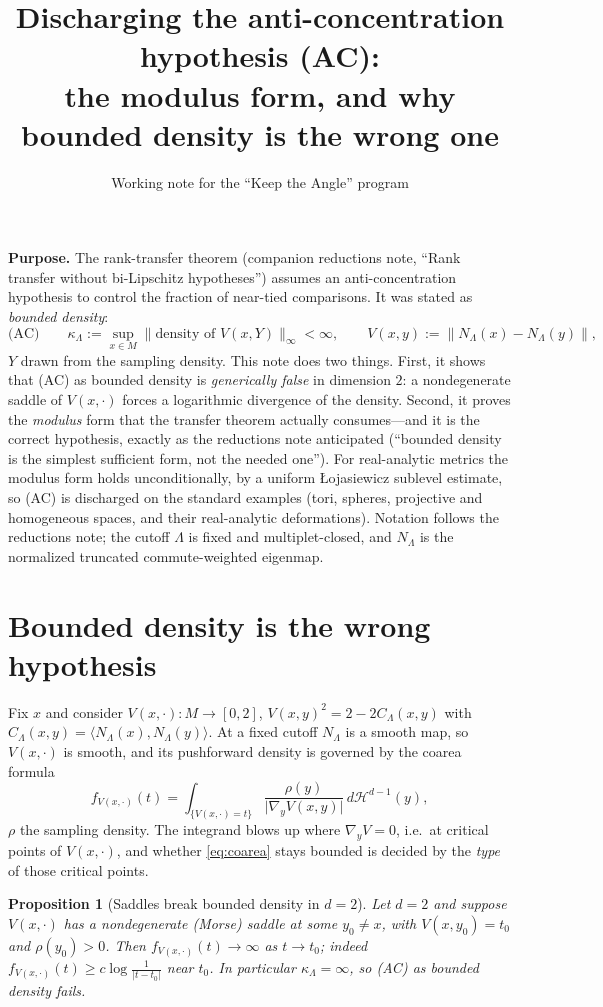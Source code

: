 \documentclass[11pt]{article}
\title{Discharging the anti-concentration hypothesis (AC):\\
the modulus form, and why bounded density is the wrong one}
\author{Working note for the ``Keep the Angle'' program}
\date{}
\newtheorem{proposition}[theorem]{Proposition}
\theoremstyle{remark}
\newcommand{\NL}{N_\Lambda}
\begin{document}
\maketitle

\noindent\textbf{Purpose.} The rank-transfer theorem (companion reductions note,
``Rank transfer without bi-Lipschitz hypotheses'') assumes an anti-concentration
hypothesis to control the fraction of near-tied comparisons. It was stated as
\emph{bounded density}:
\[
\text{(AC)}\qquad \kappa_\Lambda:=\sup_{x\in M}\bigl\lVert\text{density of }V(x,Y)\bigr\rVert_\infty<\infty,
\qquad V(x,y):=\lVert\NL(x)-\NL(y)\rVert,
\]
$Y$ drawn from the sampling density. This note does two things. First, it shows that
(AC) as bounded density is \emph{generically false} in dimension $2$: a nondegenerate
saddle of $V(x,\cdot)$ forces a logarithmic divergence of the density. Second, it proves
the \emph{modulus} form that the transfer theorem actually consumes---and it is the
correct hypothesis, exactly as the reductions note anticipated (``bounded density is the
simplest sufficient form, not the needed one''). For real-analytic metrics the modulus
form holds unconditionally, by a uniform \L ojasiewicz sublevel estimate, so (AC) is
discharged on the standard examples (tori, spheres, projective and homogeneous spaces,
and their real-analytic deformations). Notation follows the reductions note; the cutoff
$\Lambda$ is fixed and multiplet-closed, and $\NL$ is the normalized truncated
commute-weighted eigenmap.

\section{Bounded density is the wrong hypothesis}

Fix $x$ and consider $V(x,\cdot):M\to[0,2]$, $V(x,y)^2=2-2C_\Lambda(x,y)$ with
$C_\Lambda(x,y)=\langle\NL(x),\NL(y)\rangle$. At a fixed cutoff $\NL$ is a smooth map,
so $V(x,\cdot)$ is smooth, and its pushforward density is governed by the coarea formula
\begin{equation}\label{eq:coarea}
f_{V(x,\cdot)}(t)=\int_{\{V(x,\cdot)=t\}}\frac{\rho(y)}{\lvert\nabla_y V(x,y)\rvert}\,d\mathcal H^{d-1}(y),
\end{equation}
$\rho$ the sampling density. The integrand blows up where $\nabla_y V=0$, i.e.\ at
critical points of $V(x,\cdot)$, and whether \eqref{eq:coarea} stays bounded is decided
by the \emph{type} of those critical points.

\begin{proposition}[Saddles break bounded density in $d=2$]\label{prop:saddle}
Let $d=2$ and suppose $V(x,\cdot)$ has a nondegenerate (Morse) saddle at some
$y_0\ne x$, with $V(x,y_0)=t_0$ and $\rho(y_0)>0$. Then $f_{V(x,\cdot)}(t)\to\infty$ as
$t\to t_0$; indeed $f_{V(x,\cdot)}(t)\ge c\log\frac1{\lvert t-t_0\rvert}$ near $t_0$. In
particular $\kappa_\Lambda=\infty$, so (AC) as bounded density fails.
\end{proposition}
\end{document}
